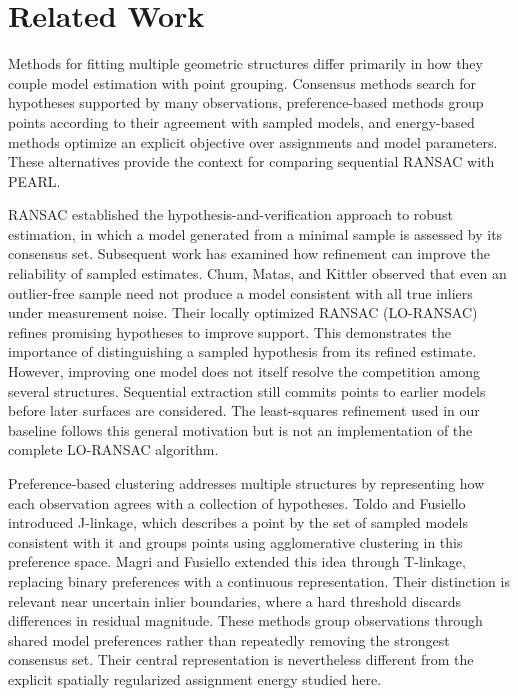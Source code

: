 \section{Related Work}\label{related-work}

Methods for fitting multiple geometric structures differ primarily in how they couple model estimation with point grouping. Consensus methods search for hypotheses supported by many observations, preference-based methods group points according to their agreement with sampled models, and energy-based methods optimize an explicit objective over assignments and model parameters. These alternatives provide the context for comparing sequential RANSAC with PEARL.

RANSAC \cite{fischler1981ransac} established the hypothesis-and-verification approach to robust estimation, in which a model generated from a minimal sample is assessed by its consensus set. Subsequent work has examined how refinement can improve the reliability of sampled estimates. Chum, Matas, and Kittler \cite{chum2003locally} observed that even an outlier-free sample need not produce a model consistent with all true inliers under measurement noise. Their locally optimized RANSAC (LO-RANSAC) refines promising hypotheses to improve support. This demonstrates the importance of distinguishing a sampled hypothesis from its refined estimate. However, improving one model does not itself resolve the competition among several structures. Sequential extraction still commits points to earlier models before later surfaces are considered. The least-squares refinement used in our baseline follows this general motivation but is not an implementation of the complete LO-RANSAC algorithm.

Preference-based clustering addresses multiple structures by representing how each observation agrees with a collection of hypotheses. Toldo and Fusiello \cite{toldo2008jlinkage} introduced J-linkage, which describes a point by the set of sampled models consistent with it and groups points using agglomerative clustering in this preference space. Magri and Fusiello \cite{magri2014tlinkage} extended this idea through T-linkage, replacing binary preferences with a continuous representation. Their distinction is relevant near uncertain inlier boundaries, where a hard threshold discards differences in residual magnitude. These methods group observations through shared model preferences rather than repeatedly removing the strongest consensus set. Their central representation is nevertheless different from the explicit spatially regularized assignment energy studied here.

